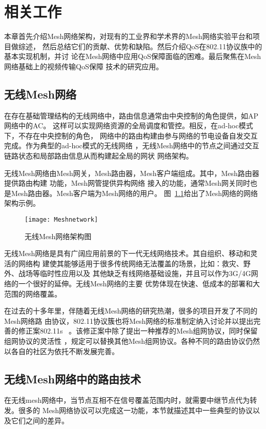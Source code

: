 \chapter{相关工作}
\label{cha:related_work}
本章首先介绍Mesh网络架构，对现有的工业界和学术界的Mesh网络实验平台和项目做综述，
然后总结它们的贡献、优势和缺陷。然后介绍QoS在802.11协议族中的基本实现机制，并讨
论在Mesh网络中应用QoS保障面临的困难。最后聚焦在Mesh网络基础上的视频传输QoS保障
技术的研究应用。

\section{无线Mesh网络}
在存在基础管理结构的无线网络中，路由信息通常由中央控制的角色提供，如AP网络中的AC。
这样可以实现网络资源的全局调度和管控。相反，在ad-hoc模式下，不存在中央控制的角色，
网络中的路由构建由参与网络的节电设备自发交互完成。作为典型的ad-hoc模式的无线网络
，无线Mesh网络中的节点之间通过交互链路状态和局部路由信息从而构建起全局的网状
网络架构。

无线Mesh网络由Mesh网关，Mesh路由器，Mesh客户端组成。其中，Mesh路由器提供路由构建
功能，Mesh网管提供异构网络
接入的功能，通常Mesh网关同时也是Mesh路由器。Mesh客户端为Mesh网络的用户。
图~\ref{fig:meshnetwork}给出了Mesh网络的网络架构示例。
\begin{figure}[H] %
  \centering
  \texttt{[image: Meshnetwork]}
  \caption{无线Mesh网络架构图}
  \label{fig:meshnetwork}
\end{figure}

无线Mesh网络是具有广阔应用前景的下一代无线网络技术。其自组织、移动和灵活的网络构
建使其能够适用于很多传统网络无法覆盖的场景，比如：救灾、野外、战场等临时性应用以及
其他缺乏有线网络基础设施，并且可以作为3G/4G网络的一个很好的延伸。无线Mesh网络的主要
优势体现在快速、低成本的部署和大范围的网络覆盖。

在过去的十多年里，伴随着无线Mesh网络的研究热潮，很多的项目开发了不同的Mesh网络路
由协议，802.11协议簇也将Mesh网络的标准制定纳入讨论并以提出完善的修正案802.11s
~\cite{IEEE80211s}。该修正案中除了提出一种推荐的Mesh组网协议，同时保留组网协议的灵活性
，规定可以替换其他Mesh组网协议。各种不同的路由协议仍然以各自的社区为依托不断发展完善。

\section{无线Mesh网络中的路由技术}
在无线mesh网络中，当节点互相不在信号覆盖范围内时，就需要中继节点代为转发。很多的
Mesh网络协议可以完成这一功能，本节就描述其中一些典型的协议以及它们之间的差异。

